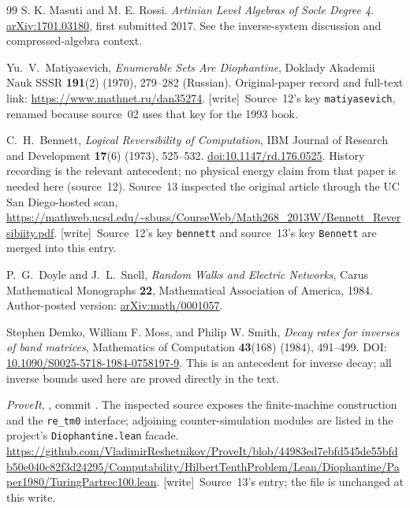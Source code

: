 \documentclass[11pt,letterpaper]{article}
\theoremstyle{definition}
\theoremstyle{remark}
\newcommand{\wtag}{\textup{[write]}}
\begin{document}
\begin{thebibliography}{99}
S. K. Masuti and M. E. Rossi.
\emph{Artinian Level Algebras of Socle Degree 4}.
\href{https://arxiv.org/abs/1701.03180}{arXiv:1701.03180}, first submitted 2017.
See the inverse-system discussion and compressed-algebra context.

Yu.~V.~Matiyasevich,
\emph{Enumerable Sets Are Diophantine},
Doklady Akademii Nauk SSSR \textbf{191}(2) (1970), 279--282 (Russian).
Original-paper record and full-text link:
\url{https://www.mathnet.ru/dan35274}.
\wtag\ Source~12's key \texttt{matiyasevich}, renamed because source~02 uses that key for the 1993 book.

C.~H.~Bennett,
\emph{Logical Reversibility of Computation},
IBM Journal of Research and Development \textbf{17}(6) (1973), 525--532.
\href{https://doi.org/10.1147/rd.176.0525}{doi:10.1147/rd.176.0525}.
History recording is the relevant antecedent; no physical energy claim
from that paper is needed here (source~12). Source~13 inspected the original article through the UC San Diego-hosted scan,
\url{https://mathweb.ucsd.edu/~sbuss/CourseWeb/Math268_2013W/Bennett_Reversibiity.pdf}.
\wtag\ Source~12's key \texttt{bennett} and source~13's key \texttt{Bennett} are merged into this entry.

P.~G.~Doyle and J.~L.~Snell,
\emph{Random Walks and Electric Networks},
Carus Mathematical Monographs \textbf{22}, Mathematical Association of
America, 1984. Author-posted version:
\href{https://arxiv.org/abs/math/0001057}{arXiv:math/0001057}.

Stephen Demko, William F. Moss, and Philip W. Smith,
\emph{Decay rates for inverses of band matrices},
Mathematics of Computation \textbf{43}(168) (1984), 491--499.
DOI: \href{https://doi.org/10.1090/S0025-5718-1984-0758197-9}{10.1090/S0025-5718-1984-0758197-9}.
This is an antecedent for inverse decay; all inverse bounds used here are
proved directly in the text.

\emph{ProveIt}, ,
commit . The inspected source exposes the finite-machine construction
and the \texttt{re\_tm0} interface; adjoining counter-simulation modules are
listed in the project's \texttt{Diophantine.lean} facade.
\url{https://github.com/VladimirReshetnikov/ProveIt/blob/44983ed7ebfd545de55bfdb50e040c82f3d24295/Computability/HilbertTenthProblem/Lean/Diophantine/Paper1980/TuringPartrec100.lean}.
\wtag\ Source~13's entry; the file is unchanged at this write.


\end{thebibliography}
\end{document}
